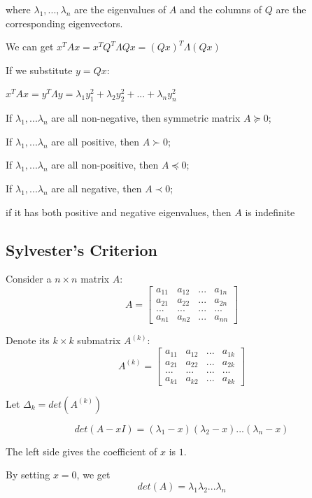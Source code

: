 \documentclass[11pt]{elegantbook}
\begin{document}
where $\lambda_1,..., \lambda_n$ are the eigenvalues of $A$ and the columns of $Q$ are the corresponding eigenvectors.

    We can get $x^TAx=x^TQ^T\Lambda Qx=(Qx)^T\Lambda(Qx)$
    
    If we substitute $y=Qx$:
    
    $x^TAx=y^T\Lambda y=\lambda_1y_1^2+\lambda_2y_2^2+...+\lambda_ny_n^2$

\begin{theorem}
    If $\lambda_1,...\lambda_n$ are all non-negative, then symmetric matrix $A\succeq 0$;
    
    If $\lambda_1,...\lambda_n$ are all positive, then $A\succ 0$;
    
    If $\lambda_1,...\lambda_n$ are all non-positive, then $A\preceq 0$;
    
    If $\lambda_1,...\lambda_n$ are all negative, then $A\prec 0$;
    
    if it has both positive and negative eigenvalues, then $A$ is indefinite
\end{theorem}

\subsection{Sylvester’s Criterion}

Consider a $n\times n$ matrix $A$: $$A=\begin{bmatrix}
    a_{11}&a_{12}&... &a_{1n}\\a_{21}&a_{22}&...&a_{2n}\\...&...&...&...\\a_{n1}&a_{n2}&...&a_{nn}
\end{bmatrix}$$

Denote its $k\times k$ submatrix $A^{(k)}$:
$$A^{(k)}=\begin{bmatrix}
    a_{11}&a_{12}&... &a_{1k}\\a_{21}&a_{22}&...&a_{2k}\\...&...&...&...\\a_{k1}&a_{k2}&...&a_{kk}
\end{bmatrix}$$

Let $\Delta_k=det(A^{(k)})$

$$det(A-xI)=(\lambda_1-x)(\lambda_2-x)...(\lambda_n-x)$$
\begin{note}
    The left side gives the coefficient of $x$ is $1$.
\end{note}
By setting $x = 0$, we get $$det(A) = \lambda_1\lambda_2...\lambda_n$$
\end{document}
